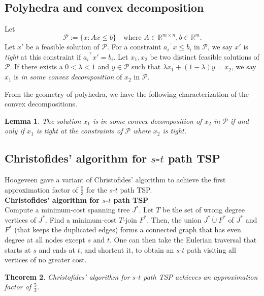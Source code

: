 \documentclass[11pt]{article}
\newtheorem{theorem}{Theorem}[section]
\newtheorem{lemma}[theorem]{Lemma}
\begin{document}
\subsection{Polyhedra and convex decomposition}

Let
\[
\mathcal{P}:=\{x: Ax\leq b\} \quad \text{where } A\in \mathbb{R}^{m\times n}, b\in \mathbb{R}^{m}.
\]
Let $x'$ be a feasible solution of $\mathcal{P}$. For a constraint ${a_i}^{^\intercal}x\leq b_i$ in $\mathcal{P}$, we say $x'$ is \emph{tight} at this constraint if ${a_i}^{^\intercal}x'= b_i$. Let $x_1, x_2$ be two distinct feasible solutions of $\mathcal{P}$. If there exists a $0<\lambda<1$ and $y\in \mathcal{P}$
such that $\lambda x_1+(1-\lambda) y=x_2$, we say
$x_1$ is \emph{in some convex decomposition} of $x_2$ in $\mathcal{P}$.

From the geometry of polyhedra, we have the following characterization of the convex
decompositions.

\begin{lemma}\label{lem:decomposition}
The solution $x_1$ is in some convex decomposition of $x_2$ in $\mathcal{P}$ if and only if $x_1$ is tight at the constraints of $\mathcal{P}$ where $x_2$ is tight.
\end{lemma}

\subsection{Christofides' algorithm for $s$-$t$ path TSP}
Hoogeveen \cite{hoogeveen91} gave a variant of Christofides' algorithm to achieve the first approximation
factor of $\frac{5}{3}$ for the $s$-$t$ path TSP.\\

\noindent \textbf{Christofides' algorithm for $s$-$t$ path TSP}\\
\noindent Compute a minimum-cost spanning tree $J^*$. Let $T$ be the set of wrong degree vertices of $J^*$.
Find a minimum-cost $T$-join $F^*$. Then, the union $J^*\dot{\cup}F^*$ of $J^*$ and $F^*$ (that keeps the duplicated edges) forms a
connected graph that has even degree at all nodes except $s$ and $t$. One can then take the Eulerian traversal that starts
at $s$ and ends at $t$, and shortcut it, to obtain
an $s$-$t$ path visiting all vertices of no greater cost.
\begin{theorem}\cite{hoogeveen91}
Christofides' algorithm for $s$-$t$ path TSP achieves an approximation factor of $\frac{5}{3}$.
\end{theorem}
\end{document}

